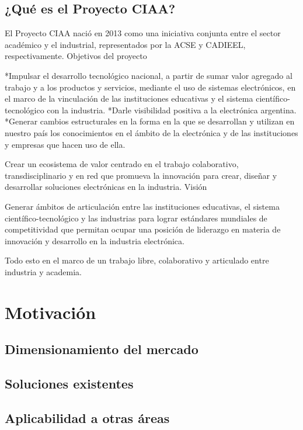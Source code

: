 \subsection{¿Qué es el Proyecto CIAA?}

El Proyecto CIAA nació en 2013 como una iniciativa conjunta entre el sector académico y el industrial, representados por la ACSE y CADIEEL, respectivamente.
Objetivos del proyecto

*Impulsar el desarrollo tecnológico nacional, a partir de sumar valor agregado al trabajo y a los productos y servicios, mediante el uso de sistemas electrónicos, en el marco de la vinculación de las instituciones educativas y el sistema científico-tecnológico con la industria.
*Darle visibilidad positiva a la electrónica argentina.
*Generar cambios estructurales en la forma en la que se desarrollan y utilizan en nuestro país los conocimientos en el ámbito de la electrónica y de las instituciones y empresas que hacen uso de ella.

Crear un ecosistema de valor centrado en el trabajo colaborativo, transdisciplinario y en red que promueva la innovación para crear, diseñar y desarrollar soluciones electrónicas en la industria.
Visión

Generar ámbitos de articulación entre las instituciones educativas, el sistema científico-tecnológico y las industrias para lograr estándares mundiales de competitividad que permitan ocupar una posición de liderazgo en materia de innovación y desarrollo en la industria electrónica.

Todo esto en el marco de un trabajo libre, colaborativo y articulado entre industria y academia. 


\section{Motivación}


\subsection{Dimensionamiento del mercado}

\subsection{Soluciones existentes}

\subsection{Aplicabilidad a otras áreas}





